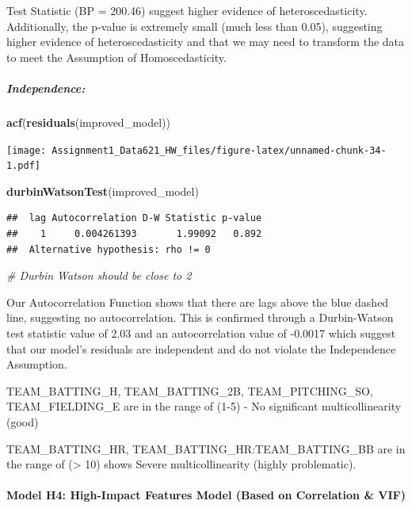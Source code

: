 \documentclass[
]{article}
\newenvironment{Shaded}{\begin{snugshade}}{\end{snugshade}}
\newcommand{\CommentTok}[1]{\textcolor[rgb]{0.56,0.35,0.01}{\textit{#1}}}
\newcommand{\FunctionTok}[1]{\textcolor[rgb]{0.13,0.29,0.53}{\textbf{#1}}}
\newcommand{\NormalTok}[1]{#1}
\begin{document}
Test Statistic (BP = 200.46) suggest higher evidence of
heteroscedasticity. Additionally, the p-value is extremely small (much
less than 0.05), suggesting higher evidence of heteroscedasticity and
that we may need to transform the data to meet the Assumption of
Homoscedasticity.

\subparagraph{Independence:}\label{independence-2}

\begin{Shaded}
\begin{Highlighting}[]
\FunctionTok{acf}\NormalTok{(}\FunctionTok{residuals}\NormalTok{(improved\_model))}
\end{Highlighting}
\end{Shaded}

\texttt{[image: Assignment1\_Data621\_HW\_files/figure-latex/unnamed-chunk-34-1.pdf]}

\begin{Shaded}
\begin{Highlighting}[]
\FunctionTok{durbinWatsonTest}\NormalTok{(improved\_model)}
\end{Highlighting}
\end{Shaded}

\begin{verbatim}
##  lag Autocorrelation D-W Statistic p-value
##    1     0.004261393       1.99092   0.892
##  Alternative hypothesis: rho != 0
\end{verbatim}

\begin{Shaded}
\begin{Highlighting}[]
\CommentTok{\# Durbin Watson should be close to 2}
\end{Highlighting}
\end{Shaded}

Our Autocorrelation Function shows that there are lags above the blue
dashed line, suggesting no autocorrelation. This is confirmed through a
Durbin-Watson test statistic value of 2.03 and an autocorrelation value
of -0.0017 which suggest that our model's residuals are independent and
do not violate the Independence Assumption.

TEAM\_BATTING\_H, TEAM\_BATTING\_2B, TEAM\_PITCHING\_SO,
TEAM\_FIELDING\_E are in the range of (1-5) - No significant
multicollinearity (good)

TEAM\_BATTING\_HR, TEAM\_BATTING\_HR:TEAM\_BATTING\_BB are in the range
of (\textgreater{} 10) shows Severe multicollinearity (highly
problematic).

\paragraph{Model H4: High-Impact Features Model (Based on Correlation \&
VIF)}\label{model-h4-high-impact-features-model-based-on-correlation-vif}
\end{document}

